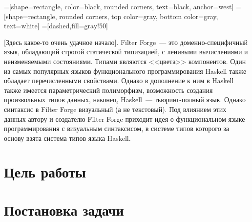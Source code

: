 


    =[shape=rectangle, color=black, rounded corners,%
    text=black, anchor=west]
    =[shape=rectangle, rounded corners,%
    top color=gray,%
    bottom color=gray, text=white]
    =[dashed,fill=gray!50]



\Intro
[Здесь какое-то очень удачное начало]. Filter Forge~--- это доменно-специфичный язык, обладающий строгой статической типизацией, с ленивыми вычислениями и неизменяемыми состояниями. Типами являются <<цвета>> компонентов. Один из самых популярных языков функционального программирования Haskell также обладает перечисленными свойствами. Однако в дополнение к ним в Haskell также имеется параметрический полиморфизм, возможность создания произвольных типов данных, наконец, Haskell~--- тьюринг-полный язык. Однако синтаксис в Filter Forge визуальный (а не текстовый). Под влиянием этих данных автору и создателю Filter Forge приходит идея о функциональном языке программирования с визуальным синтаксисом, в системе типов которого за основу взята система типов языка Haskell.\

\section*{Цель работы}
\section*{Постановка задачи}


